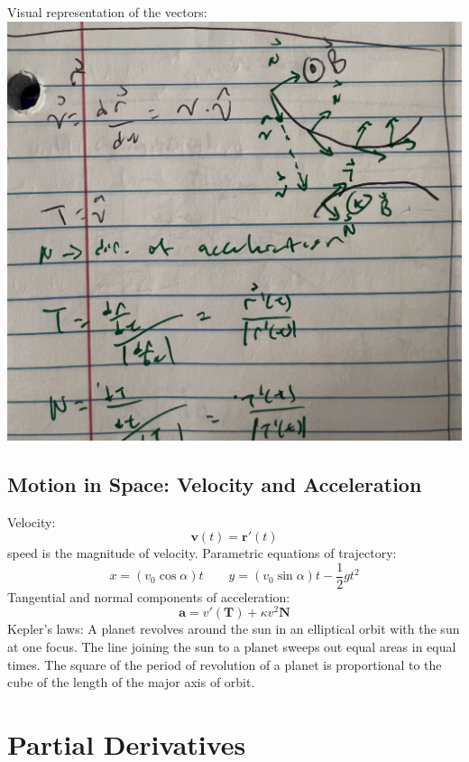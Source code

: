 \documentclass{article}
\begin{document}
\begin{outline}
        \1 Visual representation of the vectors: \\\includegraphics[scale=0.1]{visual-vectors.jpg}
    \end{outline}
    
    \subsection{Motion in Space: Velocity and Acceleration}
    \begin{outline}
        \1 Velocity: \[\mathbf v(t)=\mathbf r'(t)\]
        \1 speed is the magnitude of velocity. 
        \1 Parametric equations of trajectory: \[x=(v_0\cos\alpha)t\qquad y=(v_0\sin\alpha)t-\frac{1}{2}gt^2\]
        \1 Tangential and normal components of acceleration: \[\mathbf a=v'(\mathbf T)+\kappa v^2\mathbf N\]
        \1 Kepler's laws: 
            \2 A planet revolves around the sun in an elliptical orbit with the sun at one focus. 
            \2 The line joining the sun to a planet sweeps out equal areas in equal times. 
            \2 The square of the period of revolution of a planet is proportional to the cube of the length of the major axis of orbit. 
    \end{outline}

    \section{Partial Derivatives} %
\end{document}

